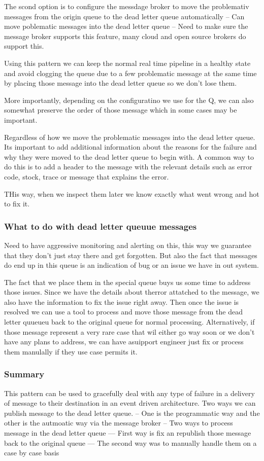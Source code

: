 \documentclass[a4paper, 11pt]{book}
\begin{document}
    The scond option is to configure the messdage broker to move the problemativ messages from the origin queue to the dead letter queue automatically
    -- Can move poblematic messages into the dead letter queue
    -- Need to make sure the message broker supports this feature, many cloud and open source brokers do support this.

    Using this pattern we can keep the normal real time pipeline in a healthy state and avoid clogging the queue due to a few problematic message at the same time by placing those message into the dead letter queue so we don't lose them.

    More importantly, depending on the configuratino we use for the Q, we can also somewhat preserve the order of those message which in some cases may be important.

    Regardless of how we move the problematic messages into the dead letter queue. Its important to add additional information about the reasons for the failure and why they were moved to the dead letter queue to begin with.
    A common way to do this is to add a header to the message with the relevant details such as error code, stock, trace or message that explains the error.

    THis way, when we inspect them later we know exactly what went wrong and hot to fix it.

    \subsubsection{What to do with dead letter queuue messages}
    Need to have aggressive monitoring and alerting on this, this way we guarantee that they don't just stay there and get forgotten.
    But also the fact that messages do end up in this queue is an indication of bug or an issue we have in out system.

    The fact that we place them in the special queue buys us some time to address those issues.
    Since we have the details about therror attatched to the message, we also have the information to fix the issue right away.
    Then once the issue is resolved we can use a tool to process and move those message from the dead letter quueueu back to the original queue for normal processing.
    Alternatively, if those message represent a very rare case that wil either go way soon or we don't have any plans to address, we can have asuipport engineer just fix or process them manulally if they use case permits it.

    \subsubsection{Summary}
    This pattern can be used to gracefully deal with any type of failure in a delivery of message to their destination in an event driven architecture.
    Two ways we can publish message to the dead letter queue.
    -- One is the programmatic way and the other is the autmoatic way via the message broker
    -- Two ways to process message in the dead letter queue
    --- First way is fix an republish those message back to the original queue
    --- The second way was to manually handle them on a case by case basis
\end{document}
